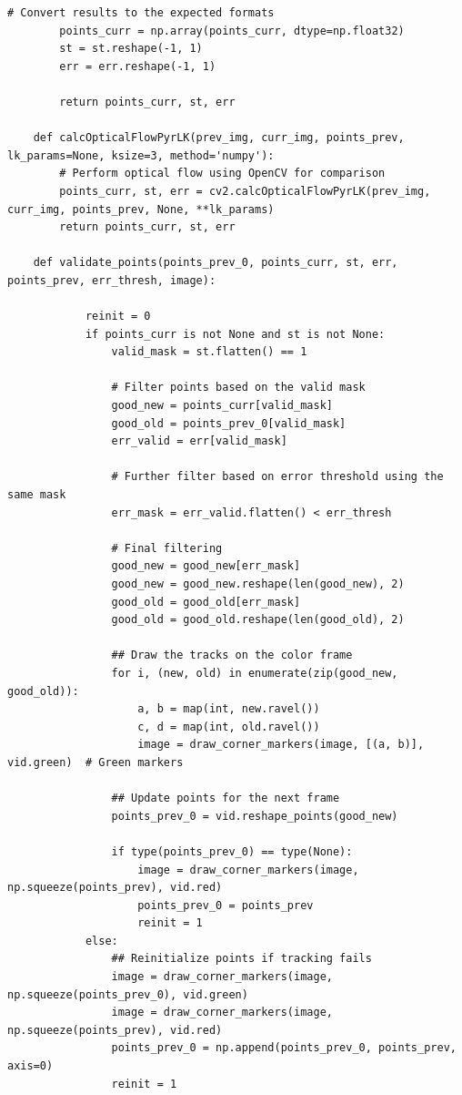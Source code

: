 \documentclass[11pt, conference, letterpaper]{IEEEtran}
\begin{document}
\begin{lstlisting}[style=python, caption={\texttt{lucas\_kanade.py}}, label={lst:lk}]
        # Convert results to the expected formats
        points_curr = np.array(points_curr, dtype=np.float32)
        st = st.reshape(-1, 1)
        err = err.reshape(-1, 1)
    
        return points_curr, st, err
    
    def calcOpticalFlowPyrLK(prev_img, curr_img, points_prev, lk_params=None, ksize=3, method='numpy'): 
        # Perform optical flow using OpenCV for comparison
        points_curr, st, err = cv2.calcOpticalFlowPyrLK(prev_img, curr_img, points_prev, None, **lk_params)
        return points_curr, st, err
    
    def validate_points(points_prev_0, points_curr, st, err, points_prev, err_thresh, image):
            
            reinit = 0
            if points_curr is not None and st is not None:                
                valid_mask = st.flatten() == 1
                
                # Filter points based on the valid mask
                good_new = points_curr[valid_mask]
                good_old = points_prev_0[valid_mask]
                err_valid = err[valid_mask]
    
                # Further filter based on error threshold using the same mask
                err_mask = err_valid.flatten() < err_thresh
    
                # Final filtering
                good_new = good_new[err_mask]
                good_new = good_new.reshape(len(good_new), 2)
                good_old = good_old[err_mask]
                good_old = good_old.reshape(len(good_old), 2)
                
                ## Draw the tracks on the color frame
                for i, (new, old) in enumerate(zip(good_new, good_old)):
                    a, b = map(int, new.ravel())
                    c, d = map(int, old.ravel())
                    image = draw_corner_markers(image, [(a, b)], vid.green)  # Green markers
    
                ## Update points for the next frame
                points_prev_0 = vid.reshape_points(good_new)
                
                if type(points_prev_0) == type(None):
                    image = draw_corner_markers(image, np.squeeze(points_prev), vid.red)
                    points_prev_0 = points_prev
                    reinit = 1
            else:
                ## Reinitialize points if tracking fails
                image = draw_corner_markers(image, np.squeeze(points_prev_0), vid.green)
                image = draw_corner_markers(image, np.squeeze(points_prev), vid.red)
                points_prev_0 = np.append(points_prev_0, points_prev, axis=0)
                reinit = 1
            

\end{lstlisting}
\end{document}
